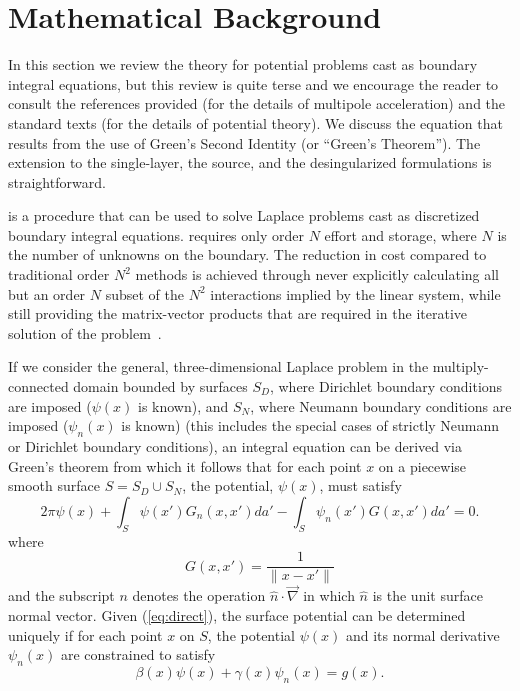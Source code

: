 \newpage
\appendix
\section{Mathematical Background}
\label{s:comp}
In this section we review the theory for potential 
problems cast as boundary integral equations, but this review is quite 
terse and we encourage the reader to consult the references 
provided (for the details of multipole acceleration) and the standard
texts (for the details of potential theory).  We discuss the 
equation that results from the use of Green's Second Identity
(or ``Green's Theorem'').  The extension to the single-layer, the
source, and the desingularized formulations is straightforward.

\fas is a procedure that can be used to solve Laplace problems 
cast as discretized boundary integral equations. \fas requires only 
order $N$ effort and storage, where $N$ is the number of unknowns on 
the boundary. The reduction in cost compared to traditional order $N^2$ 
methods is achieved through never explicitly calculating  all but an 
order $N$ subset of the $N^2$ interactions implied by the linear system,
while still providing the matrix-vector products that are required in 
the iterative solution of the problem~\cite{korsmeyer93}.

If we consider the general, three-dimensional Laplace problem 
in the multiply-connected domain bounded by surfaces $S_D$, where 
Dirichlet boundary conditions are imposed ($\psi(x)$ is known), 
and $S_N$, where Neumann boundary conditions are imposed 
($\psi_n(x)$ is known) (this includes the special cases of 
strictly Neumann or Dirichlet boundary conditions),  an integral equation 
can be derived via Green's theorem from which it follows that for 
each point $ x $ on a piecewise smooth surface $ S = S_D \cup S_N $, 
the potential, $ \psi(x) $, must satisfy
\begin{equation}
\label{eq:direct}
2 \pi \psi(x) + \int_S \psi(x') G_n (x,x') da'
- \int_S \psi_n (x') G(x,x')da' = 0.
\end{equation}
where 
\begin{equation}
\label{eq:green}
G(x,x') = \frac{1}{\| x - x' \|} 
\end{equation}
and the subscript $n$ denotes
the operation $\hat n \cdot \vec \nabla$ in which $\hat n$ is the unit
surface normal vector.
Given (\ref{eq:direct}), the surface potential can be determined
uniquely if for each point $ x $ on $ S $, the potential
$ \psi(x)$ and its normal derivative
$ \psi_n(x)$ are constrained to satisfy
\begin{equation}
\label{eq:genbc}
\beta(x) \psi(x) + \gamma (x) \psi_n(x) = g(x).
\end{equation}

